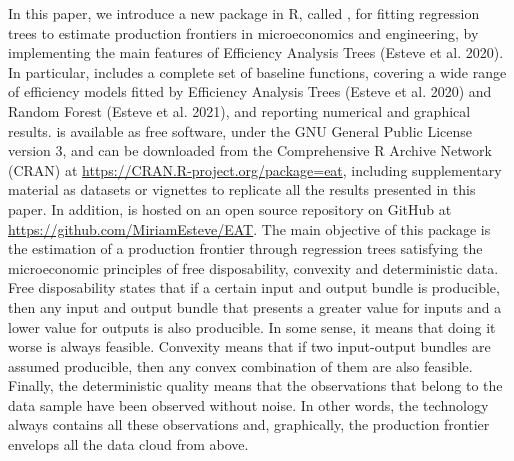 In this paper, we introduce a new package in R, called , for fitting regression trees to estimate production frontiers in microeconomics and engineering, by implementing the main features of Efficiency Analysis Trees (Esteve et al. 2020). In particular,  includes a complete set of baseline functions, covering a wide range of efficiency models fitted by Efficiency Analysis Trees (Esteve et al. 2020) and Random Forest (Esteve et al. 2021), and reporting numerical and graphical results.  is available as free software, under the GNU General Public License version 3, and can be downloaded from the Comprehensive R Archive Network (CRAN) at \url{https://CRAN.R-project.org/package=eat}, including supplementary material as datasets or vignettes to replicate all the results presented in this paper. In addition,  is hosted on an open source repository on GitHub at \url{https://github.com/MiriamEsteve/EAT}. The main objective of this package is the estimation of a production frontier through regression trees satisfying the microeconomic principles of free disposability, convexity and deterministic data. Free disposability states that if a certain input and output bundle is producible, then any input and output bundle that presents a greater value for inputs and a lower value for outputs is also producible. In some sense, it means that doing it worse is always feasible. Convexity means that if two input-output bundles are assumed producible, then any convex combination of them are also feasible. Finally, the deterministic quality means that the observations that belong to the data sample have been observed without noise. In other words, the technology always contains all these observations and, graphically, the production frontier envelops all the data cloud from above.


